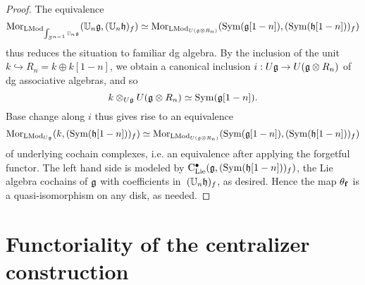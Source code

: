 \documentclass[11pt]{amsart}
\numberwithin{equation}{section}
\begin{document}
\begin{proof}
The equivalence
\[
{\rm Mor}_{{\rm LMod}_{\int_{S^{n-1}} \mathbb U_n\mathfrak g}}(\mathbb U_n \mathfrak g, (\mathbb U_n \mathfrak h)_f) 
\simeq 
{\rm Mor}_{{\rm LMod}_{U(\mathfrak g \otimes R_n)}} ({\rm Sym}(\mathfrak g[1-n]), ({\rm Sym}(\mathfrak h[1-n]))_f)
\]
thus reduces the situation to familiar dg algebra.
By the inclusion of the unit $k \hookrightarrow R_n = k \oplus k[1-n]$,
we obtain a canonical inclusion $i: U\mathfrak g \to U(\mathfrak g \otimes R_n)$ of dg associative algebras,
and so
\[
k \otimes_{U\mathfrak g} U(\mathfrak g \otimes R_n) \simeq {\rm Sym}(\mathfrak g[1-n]).
\]
Base change along $i$ thus gives rise to an equivalence 
\[
{\rm Mor}_{{\rm LMod}_{U\mathfrak g}} (k, ({\rm Sym}(\mathfrak h[1-n]))_f) \simeq {\rm Mor}_{{\rm LMod}_{U(\mathfrak g \otimes R_n)}} ({\rm Sym}(\mathfrak g[1-n]), ({\rm Sym}(\mathfrak h[1-n]))_f)
\]
of underlying cochain complexes, i.e. an equivalence after applying the forgetful functor. 
The left hand side is modeled by ${\rm C}_{\rm Lie}^\bullet(\mathfrak g,({\rm Sym}(\mathfrak h[1-n]))_f)$, 
the Lie algebra cochains of $\mathfrak g$ with coefficients in~$(\mathbb U_n \mathfrak h)_f$, as desired.
Hence the map $\theta_{\bf f}$ is a quasi-isomorphism on any disk, as needed.
\end{proof}

\section{Functoriality of the centralizer construction}
\label{S:centerinFacAlg}
\end{document}
